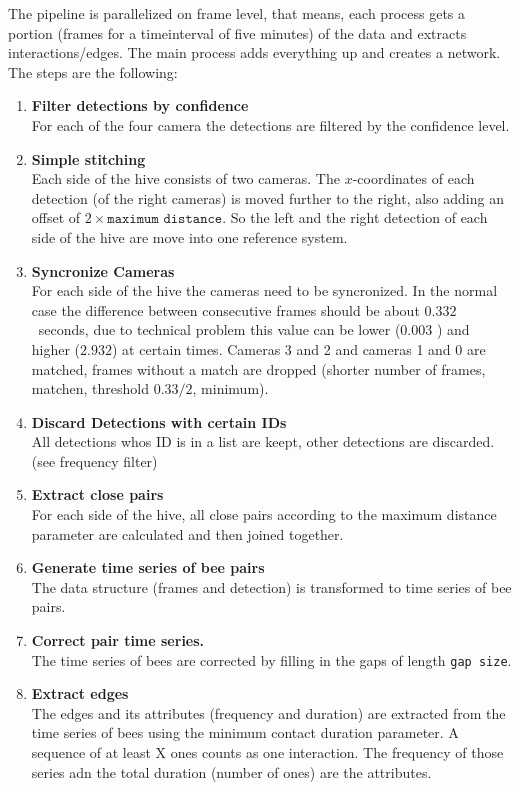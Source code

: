 The pipeline is parallelized on frame level, that means, each process gets a portion (frames for a timeinterval of five minutes) of the data and extracts interactions/edges. The main process adds everything up and creates a network.
The steps are the following:

\begin{enumerate}
\item \textbf{Filter detections by confidence}\\
For each of the four camera the detections are filtered by the confidence level.

\item \textbf{Simple stitching}\\
Each side of the hive consists of two cameras. 	The $x$-coordinates of each detection (of the right	cameras) is moved further to the right, also adding an offset of $2\times \texttt{maximum distance}$. So the left and the right detection of each side of the hive are move into one reference system.

\item \textbf{Syncronize Cameras}\\
For each side of the hive the cameras need to be syncronized. In the normal case the difference between consecutive frames should be about $0.332$~seconds, due to technical problem this value can be lower ($0.003$ ) and higher ($2.932$) at certain times. Cameras 3 and 2 and cameras 1 and 0 are matched, frames without a match are dropped (shorter number of frames, matchen, threshold $0.33/2$, minimum).

\item \textbf{Discard Detections with certain IDs}\\
All detections whos ID is in a list are keept, other detections are discarded. (see frequency filter)

\item \textbf{Extract close pairs}\\
For each side of the hive, all close pairs according to the maximum distance parameter are calculated and then joined together.

\item \textbf{Generate time series of bee pairs}\\
The data structure (frames and detection) is transformed to time series of bee pairs.

\item \textbf{Correct pair time series.}\\
The time series of bees are corrected by filling in the gaps of length \texttt{gap size}.

\item \textbf{Extract edges}\\
The edges and its attributes (frequency and duration) are extracted from the time series of bees using the minimum contact duration parameter. A sequence of at least X ones counts as one interaction. The frequency of those series adn the total duration (number of ones) are the attributes.


\end{enumerate}

